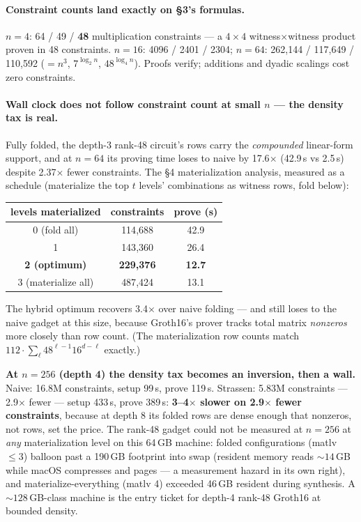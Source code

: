 \documentclass[10pt]{article}
\begin{document}
\paragraph{Constraint counts land exactly on \S3's formulas.}
$n=4$: 64 / 49 / \textbf{48} multiplication constraints --- a
$4{\times}4$ witness$\times$witness product proven in 48
constraints. $n=16$: 4096 / 2401 / 2304; $n=64$: 262{,}144 /
117{,}649 / 110{,}592 ($= n^3$, $7^{\log_2 n}$, $48^{\log_4 n}$).
Proofs verify; additions and dyadic scalings cost zero
constraints.

\paragraph{Wall clock does not follow constraint count at small
$n$ --- the density tax is real.} Fully folded, the depth-3
rank-48 circuit's rows carry the \emph{compounded} linear-form
support, and at $n=64$ its proving time loses to naive by
17.6$\times$ (42.9\,s vs 2.5\,s) despite 2.37$\times$ fewer
constraints. The \S4 materialization analysis, measured as a
schedule (materialize the top $t$ levels' combinations as witness
rows, fold below):
\begin{center}
\begin{tabular}{ccc}
levels materialized & constraints & prove (s)\\
\hline
0 (fold all) & 114{,}688 & 42.9\\
1 & 143{,}360 & 26.4\\
\textbf{2 (optimum)} & \textbf{229{,}376} & \textbf{12.7}\\
3 (materialize all) & 487{,}424 & 13.1\\
\end{tabular}
\end{center}
The hybrid optimum recovers 3.4$\times$ over naive folding --- and
still loses to the naive gadget at this size, because Groth16's
prover tracks total matrix \emph{nonzeros} more closely than row
count. (The materialization row counts match
$112\cdot\sum_\ell 48^{\ell-1}16^{d-\ell}$ exactly.)

\textbf{At $n = 256$ (depth 4) the density tax becomes an
inversion, then a wall.} Naive: 16.8M constraints, setup 99\,s,
prove 119\,s. Strassen: 5.83M constraints --- 2.9$\times$ fewer ---
setup 433\,s, prove 389\,s: \textbf{3--4$\times$ slower on
2.9$\times$ fewer constraints}, because at depth 8 its folded rows
are dense enough that nonzeros, not rows, set the price. The
rank-48 gadget could not be measured at $n = 256$ at \emph{any}
materialization level on this 64\,GB machine: folded
configurations (matlv $\le 3$) balloon past a 190\,GB footprint
into swap (resident memory reads ${\sim}14$\,GB while macOS
compresses and pages --- a measurement hazard in its own right),
and materialize-everything (matlv 4) exceeded 46\,GB resident
during synthesis. A ${\sim}128$\,GB-class machine is the entry
ticket for depth-4 rank-48 Groth16 at bounded density.
\end{document}
